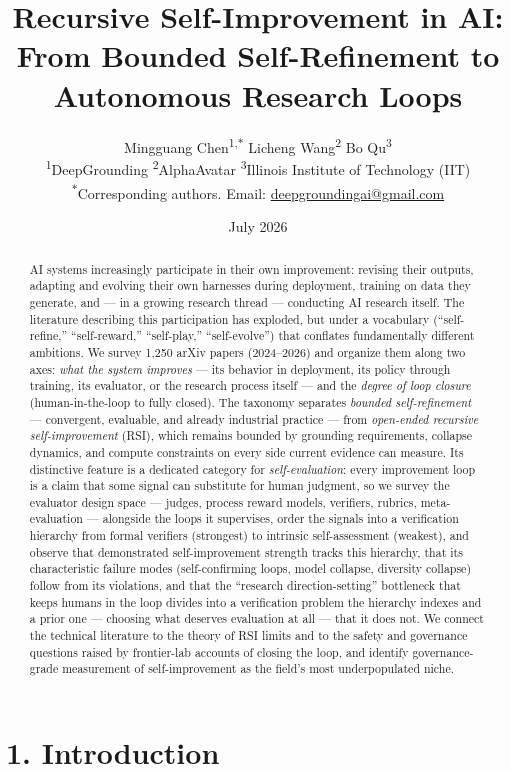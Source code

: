 \documentclass[
  11pt,
]{article}
\title{Recursive Self-Improvement in AI: From Bounded Self-Refinement to
Autonomous Research Loops}
\author{Mingguang Chen\textsuperscript{1,$*$} \quad Licheng Wang\textsuperscript{2} \quad Bo Qu\textsuperscript{3}\\[6pt]
{\small \textsuperscript{1}DeepGrounding \quad
\textsuperscript{2}AlphaAvatar \quad
\textsuperscript{3}Illinois Institute of Technology (IIT)}\\[2pt]
{\small \textsuperscript{$*$}Corresponding authors. Email: \href{mailto:deepgroundingai@gmail.com}{deepgroundingai@gmail.com}}}
\date{July 2026}
\begin{document}
\maketitle

\begin{abstract}
AI systems increasingly participate in their own improvement: revising
their outputs, adapting and evolving their own harnesses during
deployment, training on data they generate, and --- in a growing
research thread --- conducting AI research itself. The literature
describing this participation has exploded, but under a vocabulary
(``self-refine,'' ``self-reward,'' ``self-play,'' ``self-evolve'') that
conflates fundamentally different ambitions. We survey 1,250 arXiv
papers (2024--2026) and organize them along two axes: \emph{what the
system improves} --- its behavior in deployment, its policy through
training, its evaluator, or the research process itself --- and the
\emph{degree of loop closure} (human-in-the-loop to fully closed). The
taxonomy separates \emph{bounded self-refinement} --- convergent,
evaluable, and already industrial practice --- from \emph{open-ended
recursive self-improvement} (RSI), which remains bounded by grounding
requirements, collapse dynamics, and compute constraints on every side
current evidence can measure. Its distinctive feature is a dedicated
category for \emph{self-evaluation}: every improvement loop is a claim
that some signal can substitute for human judgment, so we survey the
evaluator design space --- judges, process reward models, verifiers,
rubrics, meta-evaluation --- alongside the loops it supervises, order
the signals into a verification hierarchy from formal verifiers
(strongest) to intrinsic self-assessment (weakest), and observe that
demonstrated self-improvement strength tracks this hierarchy, that its
characteristic failure modes (self-confirming loops, model collapse,
diversity collapse) follow from its violations, and that the ``research
direction-setting'' bottleneck that keeps humans in the loop divides
into a verification problem the hierarchy indexes and a prior one ---
choosing what deserves evaluation at all --- that it does not. We
connect the technical literature to the theory of RSI limits and to the
safety and governance questions raised by frontier-lab accounts of
closing the loop, and identify governance-grade measurement of
self-improvement as the field's most underpopulated niche.
\end{abstract}

\section{1. Introduction}\label{introduction}
\end{document}
